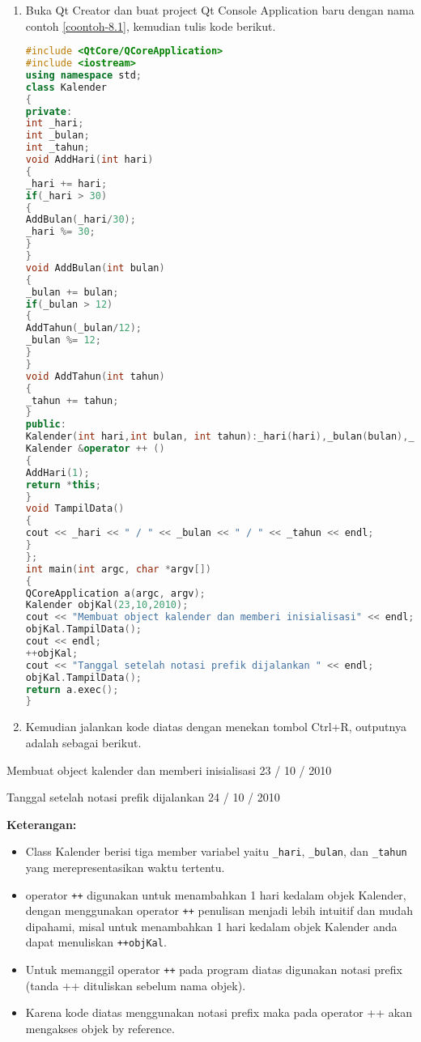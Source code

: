 \begin{enumerate}

\item
  Buka Qt Creator dan buat project Qt Console Application baru dengan
  nama contoh \ref{coontoh-8.1}, kemudian tulis kode berikut.

\begin{lstlisting}[language=c++, caption=Menggunakan Increment Operator (Notasi prefix), label=coontoh-8.1]
#include <QtCore/QCoreApplication>
#include <iostream>
using namespace std;
class Kalender
{
private:
int _hari;
int _bulan;
int _tahun;
void AddHari(int hari)
{
_hari += hari;
if(_hari > 30)
{
AddBulan(_hari/30);
_hari %= 30;
}
}
void AddBulan(int bulan)
{
_bulan += bulan;
if(_bulan > 12)
{
AddTahun(_bulan/12);
_bulan %= 12;
}
}
void AddTahun(int tahun)
{
_tahun += tahun;
}
public:
Kalender(int hari,int bulan, int tahun):_hari(hari),_bulan(bulan),_tahun(tahun){ }
Kalender &operator ++ ()
{
AddHari(1);
return *this;
}
void TampilData()
{
cout << _hari << " / " << _bulan << " / " << _tahun << endl;
}
};
int main(int argc, char *argv[])
{
QCoreApplication a(argc, argv);
Kalender objKal(23,10,2010);
cout << "Membuat object kalender dan memberi inisialisasi" << endl;
objKal.TampilData();
cout << endl;
++objKal;
cout << "Tanggal setelah notasi prefik dijalankan " << endl;
objKal.TampilData();
return a.exec();
}
\end{lstlisting}
\item
  Kemudian jalankan kode diatas dengan menekan tombol Ctrl+R, outputnya
  adalah sebagai berikut.
\end{enumerate}

\begin{lcverbatim}
Membuat object kalender dan memberi inisialisasi
23 / 10 / 2010

Tanggal setelah notasi prefik dijalankan
24 / 10 / 2010
\end{lcverbatim}

\textbf{Keterangan:}

\begin{itemize}

\item
  Class Kalender berisi tiga member variabel yaitu \texttt{\_hari},
  \texttt{\_bulan}, dan \texttt{\_tahun} yang merepresentasikan waktu
  tertentu.
\item
  operator \texttt{++} digunakan untuk menambahkan 1 hari kedalam objek
  Kalender, dengan menggunakan operator \texttt{++} penulisan menjadi
  lebih intuitif dan mudah dipahami, misal untuk menambahkan 1 hari
  kedalam objek Kalender anda dapat menuliskan \texttt{++objKal}.
\item
  Untuk memanggil operator \texttt{++} pada program diatas digunakan
  notasi prefix (tanda ++ dituliskan sebelum nama objek).
\item
  Karena kode diatas menggunakan notasi prefix maka pada operator ++
  akan mengakses objek by reference.
\end{itemize}

